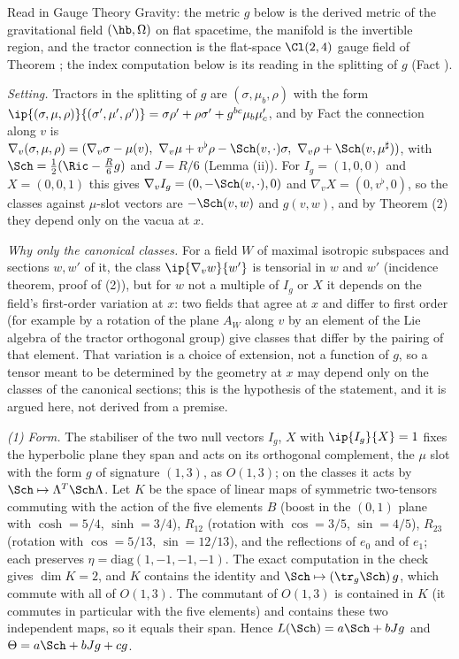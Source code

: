 Read in Gauge Theory Gravity: the metric $g$ below is the derived metric of the gravitational field $(\hb, \Omega)$ on flat spacetime, the manifold is the invertible region, and the tractor connection is the flat-space $\Cl(2,4)$ gauge field of Theorem ; the index computation below is its reading in the splitting of $g$ (Fact ).

\emph{Setting.} Tractors in the splitting of $g$ are $(\sigma, \mu_b, \rho)$ with the form $\ip{(\sigma,\mu,\rho)}{(\sigma',\mu',\rho')} = \sigma\rho' + \rho\sigma' + g^{bc}\mu_b\mu'_c$, and by Fact  the connection along $v$ is $\nabla_v(\sigma,\mu,\rho) = (\nabla_v\sigma - \mu(v),\ \nabla_v\mu + v^\flat\rho - \Sch(v,\cdot)\sigma,\ \nabla_v\rho + \Sch(v,\mu^\sharp))$, with $\Sch = \tfrac12(\Ric - \tfrac{R}{6}g)$ and $J = R/6$ (Lemma (ii)). For $I_g = (1,0,0)$ and $X = (0,0,1)$ this gives $\nabla_v I_g = (0, -\Sch(v,\cdot), 0)$ and $\nabla_v X = (0, v^\flat, 0)$, so the classes against $\mu$-slot vectors are $-\Sch(v,w)$ and $g(v,w)$, and by Theorem (2) they depend only on the vacua at $x$.

\emph{Why only the canonical classes.} For a field $W$ of maximal isotropic subspaces and sections $w, w'$ of it, the class $\ip{\nabla_v w}{w'}$ is tensorial in $w$ and $w'$ (incidence theorem, proof of (2)), but for $w$ not a multiple of $I_g$ or $X$ it depends on the field's first-order variation at $x$: two fields that agree at $x$ and differ to first order (for example by a rotation of the plane $A_W$ along $v$ by an element of the Lie algebra of the tractor orthogonal group) give classes that differ by the pairing of that element. That variation is a choice of extension, not a function of $g$, so a tensor meant to be determined by the geometry at $x$ may depend only on the classes of the canonical sections; this is the hypothesis of the statement, and it is argued here, not derived from a premise.

\emph{(1) Form.} The stabiliser of the two null vectors $I_g$, $X$ with $\ip{I_g}{X} = 1$ fixes the hyperbolic plane they span and acts on its orthogonal complement, the $\mu$ slot with the form $g$ of signature $(1,3)$, as $O(1,3)$; on the classes it acts by $\Sch \mapsto \Lambda^{T}\Sch\Lambda$. Let $K$ be the space of linear maps of symmetric two-tensors commuting with the action of the five elements $B$ (boost in the $(0,1)$ plane with $\cosh = 5/4$, $\sinh = 3/4$), $R_{12}$ (rotation with $\cos = 3/5$, $\sin = 4/5$), $R_{23}$ (rotation with $\cos = 5/13$, $\sin = 12/13$), and the reflections of $e_0$ and of $e_1$; each preserves $\eta = \mathrm{diag}(1,-1,-1,-1)$. The exact computation in the check gives $\dim K = 2$, and $K$ contains the identity and $\Sch \mapsto (\tr_g\Sch)\,g$, which commute with all of $O(1,3)$. The commutant of $O(1,3)$ is contained in $K$ (it commutes in particular with the five elements) and contains these two independent maps, so it equals their span. Hence $L(\Sch) = a\Sch + bJg$ and $\Theta = a\Sch + bJg + cg$.

